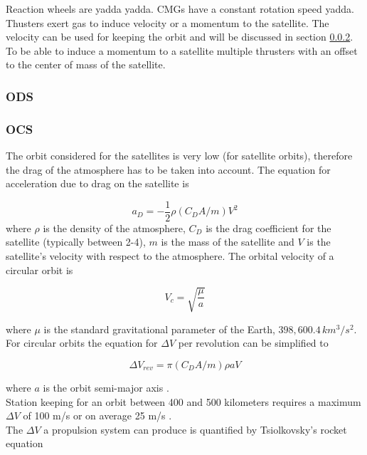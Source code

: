 Reaction wheels are yadda yadda.
\acp{CMG} have a constant rotation speed yadda.
Thusters exert gas to induce velocity or a momentum to the satellite. The velocity can be used for keeping the orbit and will be discussed in section \ref{ss:ocs}. To be able to induce a momentum to a satellite multiple thrusters with an offset to the center of mass of the satellite. 
\subsubsection{\ac{ODS}}
\label{ss:ods}

\subsubsection{\ac{OCS}}
\label{ss:ocs}
The orbit considered for the satellites is very low (for satellite orbits), therefore the drag of the atmosphere has to be taken into account. The equation for acceleration due to drag on the satellite is

\begin{equation}
a_D=-\frac{1}{2}\rho \left(C_DA/m\right)V^2
\label{eqn:atmosdrag}
\end{equation}
where $\rho$ is the density of the atmosphere, $C_D$ is the drag coefficient for the satellite (typically between 2-4), $m$ is the mass of the satellite and $V$ is the satellite's velocity with respect to the atmosphere. The orbital velocity of a circular orbit is

\begin{equation}
V_c=\sqrt{\frac{\mu}{a}}
\label{eqn:orbitalvel}
\end{equation}

where $\mu$ is the standard gravitational parameter of the Earth, $398,600.4 \,km^3/s^2$. For circular orbits the equation for $\Delta V$ per revolution can be simplified to

\begin{equation}
\Delta V_{rev}=\pi \left(C_DA/m\right)\rho a V
\label{eqn:deltaVrev}
\end{equation}

where $a$ is the orbit semi-major axis \cite{larson}.\\

Station keeping for an orbit between 400 and 500 kilometers requires a maximum $\Delta V$ of 100 m/s or on average 25 m/s \cite{deltavtu}.\\

The $\Delta V$ a propulsion system can produce is quantified by Tsiolkovsky's rocket equation

